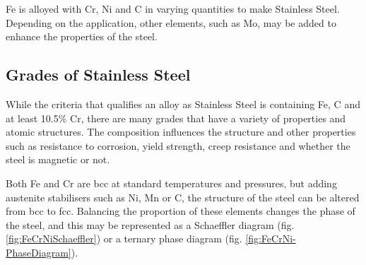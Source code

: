 \Gls{Fe} is alloyed with \Gls{Cr}, \Gls{Ni} and \Gls{C} in varying quantities to make Stainless Steel.  Depending on the application, other elements, such as \Gls{Mo}, may be added to enhance the properties of the steel.

\subsection{Grades of Stainless Steel}

While the criteria that qualifies an alloy as Stainless Steel is containing Fe, \Gls{C} and at least 10.5\% Cr, there are many grades that have a variety of properties and atomic structures.  The composition influences the structure and other properties such as resistance to corrosion, yield strength, creep resistance and whether the steel is magnetic or not.

Both Fe and Cr are \acrshort{bcc} at standard temperatures and pressures, but adding austenite stabilisers such as Ni, Mn or C, the structure of the steel can be altered from \acrshort{bcc} to \acrshort{fcc}.  Balancing the proportion of these elements changes the phase of the steel, and this may be represented as a Schaeffler diagram (fig. \ref{fig:FeCrNiSchaeffler}) or a ternary phase diagram (fig. \ref{fig:FeCrNi-PhaseDiagram}).

